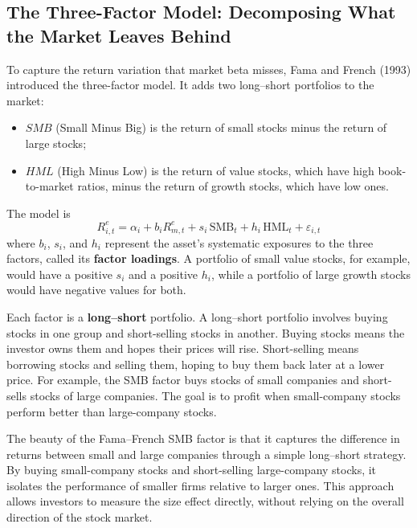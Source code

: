 \subsection{The Three-Factor Model: Decomposing What the Market Leaves Behind}
\label{sec:03-factors}
To capture the return variation that market beta misses, Fama and French (1993) introduced the three-factor model. It adds two long--short portfolios to the market:
\begin{itemize}
  \item $SMB$ (Small Minus Big) is the return of small stocks minus the return of large stocks;
  \item $HML$ (High Minus Low) is the return of value stocks, which have high book-to-market ratios, minus the return of growth stocks, which have low ones.
\end{itemize}
The model is
\begin{equation}
  R^{e}_{i,t} = \alpha_i + b_i R^{e}_{m,t} + s_i \,\mathrm{SMB}_t + h_i \,\mathrm{HML}_t + \varepsilon_{i,t}
  \label{eq:03-ff3}
\end{equation}
where $b_i$, $s_i$, and $h_i$ represent the asset's systematic exposures to the three factors, called its \textbf{factor loadings}. A portfolio of small value stocks, for example, would have a positive $s_i$ and a positive $h_i$, while a portfolio of large growth stocks would have negative values for both.

Each factor is a \textbf{long--short} portfolio. 
A long--short portfolio involves buying stocks in one group and short-selling stocks in another. Buying stocks means the investor owns them and hopes their prices will rise. Short-selling means borrowing stocks and selling them, hoping to buy them back later at a lower price. For example, the SMB factor buys stocks of small companies and short-sells stocks of large companies. The goal is to profit when small-company stocks perform better than large-company stocks.

The beauty of the Fama--French SMB factor is that it captures the difference in returns between small and large companies through a simple long--short strategy. By buying small-company stocks and short-selling large-company stocks, it isolates the performance of smaller firms relative to larger ones. This approach allows investors to measure the size effect directly, without relying on the overall direction of the stock market.

